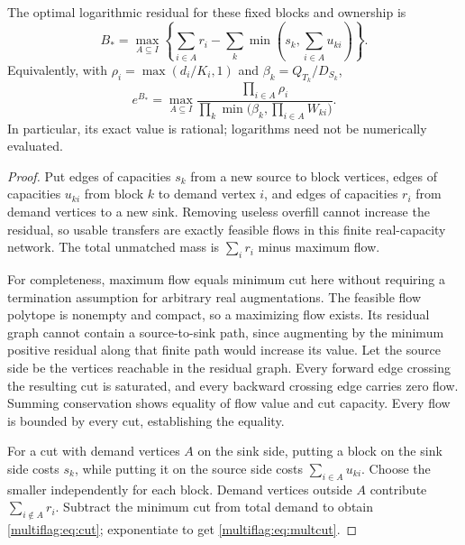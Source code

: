 \begin{theorem}\label{multiflag:thm:cut}
The optimal logarithmic residual for these fixed blocks and ownership is
\begin{equation}\label{multiflag:eq:cut}
 B_* =\max_{A\subseteq I}\left\{\sum_{i\in A}r_i-
             \sum_k\min\left(s_k,\sum_{i\in A}u_{ki}\right)\right\}.
\end{equation}
Equivalently, with \(\rho_i=\max(d_i/K_i,1)\) and \(\beta_k=Q_{T_k}/D_{S_k}\),
\begin{equation}\label{multiflag:eq:multcut}
 e^{B_*}=\max_{A\subseteq I}
 \frac{\prod_{i\in A}\rho_i}
 {\prod_k\min\bigl(\beta_k,\prod_{i\in A}W_{ki}\bigr)}.
\end{equation}
In particular, its exact value is rational; logarithms need not be numerically evaluated.
\end{theorem}
\begin{proof}
Put edges of capacities \(s_k\) from a new source to block vertices, edges of capacities \(u_{ki}\) from block \(k\) to demand vertex \(i\), and edges of capacities \(r_i\) from demand vertices to a new sink. Removing useless overfill cannot increase the residual, so usable transfers are exactly feasible flows in this finite real-capacity network. The total unmatched mass is \(\sum_i r_i\) minus maximum flow.

For completeness, maximum flow equals minimum cut here without requiring a termination assumption for arbitrary real augmentations. The feasible flow polytope is nonempty and compact, so a maximizing flow exists. Its residual graph cannot contain a source-to-sink path, since augmenting by the minimum positive residual along that finite path would increase its value. Let the source side be the vertices reachable in the residual graph. Every forward edge crossing the resulting cut is saturated, and every backward crossing edge carries zero flow. Summing conservation shows equality of flow value and cut capacity. Every flow is bounded by every cut, establishing the equality.

For a cut with demand vertices \(A\) on the sink side, putting a block on the sink side costs \(s_k\), while putting it on the source side costs \(\sum_{i\in A}u_{ki}\). Choose the smaller independently for each block. Demand vertices outside \(A\) contribute \(\sum_{i\notin A}r_i\). Subtract the minimum cut from total demand to obtain \eqref{multiflag:eq:cut}; exponentiate to get \eqref{multiflag:eq:multcut}.
\end{proof}

